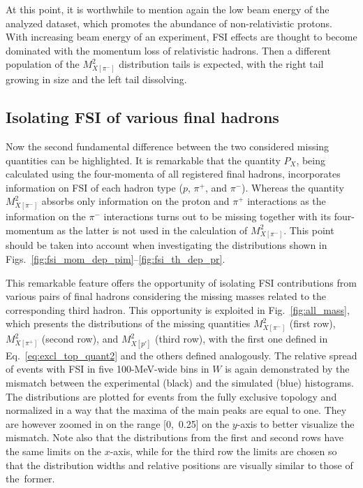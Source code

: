 At this point, it is worthwhile to mention again the low beam energy of the analyzed dataset, which promotes the abundance of non-relativistic protons. With increasing beam energy of an experiment, FSI effects are thought to become dominated with the momentum loss of relativistic hadrons. Then a different population of the $M^{2}_{X[\pi^{-}]}$ distribution tails is expected, with the right tail growing in size and the left tail dissolving.


\subsection{Isolating FSI of various final hadrons}

Now the second fundamental difference between the two considered missing quantities can be highlighted. It is remarkable that the quantity $P_{X}$, being calculated using the four-momenta of all registered final hadrons, incorporates information on FSI of each hadron type ($p$, $\pi^{+}$, and $\pi^{-}$). Whereas the quantity $M^{2}_{X[\pi^{-}]}$ absorbs only information on the proton and $\pi^{+}$ interactions as the information on the $\pi^{-}$ interactions turns out to be missing together with its four-momentum as the latter is not used in the calculation of $M^{2}_{X[\pi^{-}]}$. This point should be taken into account when investigating the distributions shown in Figs.~\ref{fig:fsi_mom_dep_pim}--\ref{fig:fsi_th_dep_pr}.

This remarkable feature offers the opportunity of isolating FSI contributions from various pairs of final hadrons considering the missing masses related to the corresponding third hadron. This opportunity is exploited in Fig.~\ref{fig:all_mass}, which presents the distributions of the missing quantities $M^{2}_{X[\pi^{-}]}$ (first row), $M^{2}_{X[\pi^{+}]}$ (second row), and $M^{2}_{X[p']}$ (third row), with the first one defined in Eq.~\eqref{eq:excl_top_quant2} and the others defined analogously. The relative spread of events with FSI in five 100-MeV-wide bins in $W$ is again demonstrated by the mismatch between the experimental (black) and the simulated (blue) histograms. The distributions are plotted for events from the fully exclusive topology and normalized in a way that the maxima of the main peaks are equal to one. They are however zoomed in on the range [0,~0.25] on the $y$-axis to better visualize the mismatch. Note also that the distributions from the first and second rows have the same limits on the $x$-axis, while for the third row the limits are chosen so that the distribution widths and relative positions are visually similar to those of the~former.

